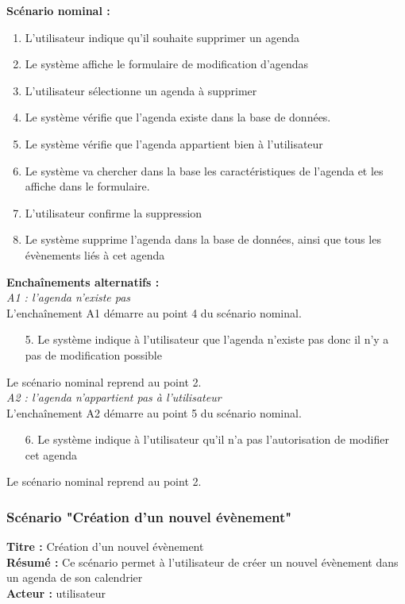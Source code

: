 \documentclass[12pt , a4paper]{article}
\begin{document}
\noindent\textbf{Scénario nominal :}
\begin{enumerate}
\item L’utilisateur indique qu'il souhaite supprimer un agenda
\item Le système affiche le formulaire de modification d’agendas
\item L’utilisateur sélectionne un agenda à supprimer
\item Le système vérifie que l’agenda existe dans la base de données.
\item Le système vérifie que l’agenda appartient bien à l’utilisateur
\item Le système va chercher dans la base les caractéristiques de l’agenda et les affiche dans le formulaire.
\item L’utilisateur confirme la suppression
\item Le système supprime l’agenda dans la base de données, ainsi que tous les évènements liés à cet agenda \\
\end{enumerate}

\noindent\textbf{Encha\^inements alternatifs :}\\
\noindent\textit{A1 : l’agenda n’existe pas}\\
L'encha\^inement A1 démarre au point 4 du scénario nominal.
\begin{enumerate}
\item[5.] Le système indique à l’utilisateur que l’agenda n’existe pas donc il n’y a pas de modification possible
\end{enumerate}
Le scénario nominal reprend au point 2.\\


\noindent\textit{A2 : l’agenda n’appartient pas à l’utilisateur}\\
L'encha\^inement A2 démarre au point 5 du scénario nominal.
\begin{enumerate}
\item[6.] Le système indique à l’utilisateur qu’il n’a pas l’autorisation de modifier cet agenda
\end{enumerate}
Le scénario nominal reprend au point 2.\\

\newpage
\subsubsection{Scénario "Création d’un nouvel évènement"}
\noindent\textbf{Titre : } Création d’un nouvel évènement\\
\textbf{Résumé : } Ce scénario permet à l’utilisateur de créer un nouvel évènement dans un agenda de son calendrier\\
\textbf{Acteur : }utilisateur\\
\end{document}
